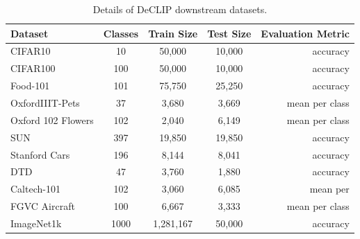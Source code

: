 \begin{table}[h]
\caption{\label{tab:downstream datasets} Details of DeCLIP downstream datasets.}
\label{sample-table}
\begin{center}
\begin{small}
\begin{sc}
\begin{tabular}{lcccr}
   \toprule  
   \textbf{Dataset}         & \textbf{Classes}  & \textbf{Train Size } &  \textbf{Test Size}  & \textbf{Evaluation Metric } \\
   \midrule   
   CIFAR10         & 10  	  &  50,000	     &     10,000      & accuracy	\\
   CIFAR100        & 100     &  50,000      &     10,000      & accuracy   \\
   Food-101	       & 101     &  75,750      &     25,250      & accuracy   	\\
   OxfordIIIT-Pets & 37      &  3,680       &     3,669       & mean per class \\
   Oxford 102 Flowers  & 102    & 2,040     &     6,149       & mean per class \\
   SUN          & 397     & 19,850       &     19,850      & accuracy \\
   Stanford Cars   & 196     & 8,144        &     8,041       & accuracy \\
   DTD             & 47      & 3,760        &     1,880       & accuracy \\    
   Caltech-101     & 102     & 3,060        &     6,085       & mean per \\
   FGVC Aircraft   & 100     & 6,667        &     3,333       & mean per class \\
   ImageNet1k     & 1000    & 1,281,167    &     50,000      & accuracy \\
  \bottomrule
\end{tabular}
\end{sc}
\end{small}
\end{center}
\end{table}

